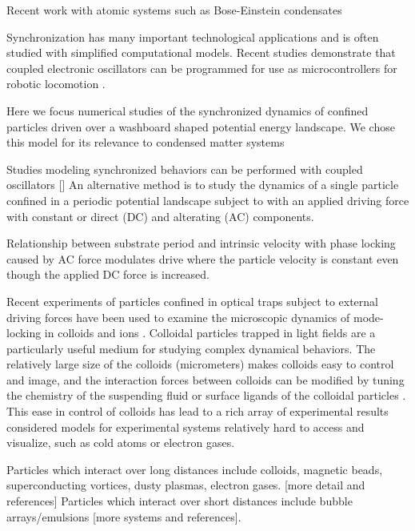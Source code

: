 \documentclass[twocolumn,preprintnumbers,amsmath,amssymb,aps,prx]{revtex4}
\begin{document}
Recent work with atomic systems such as Bose-Einstein condensates \cite{Zhang2020}

Synchronization has many important
technological applications
and is often studied with simplified computational models.
Recent studies demonstrate
that coupled electronic oscillators can be
programmed for use as microcontrollers for robotic locomotion \cite{Dutta2019}.

Here we focus numerical studies 
of the synchronized dynamics
of confined particles driven over
a washboard shaped potential energy landscape. 
We chose this model for its
relevance to condensed matter systems



Studies modeling synchronized behaviors
can be performed with
coupled oscillators []
An alternative method is to
study the dynamics of a single particle
confined in a periodic 
potential landscape subject
to with an applied driving force with constant or direct (DC)
and alterating (AC)
components.

Relationship between substrate period and intrinsic velocity
with phase locking caused by AC force modulates drive
where the particle velocity is constant even though the applied
DC force is increased.



Recent experiments of particles confined
in optical traps
subject to external driving forces 
have
been used to examine the microscopic dynamics
of mode-locking in colloids \cite{juniper2015} and ions \cite{Bushev2013}.
Colloidal particles trapped in light fields are %
a particularly useful medium for studying complex dynamical behaviors.  %
The relatively large size of the colloids (micrometers)
makes colloids easy to control and image,
and the interaction forces between colloids can be modified
by tuning the chemistry of the suspending fluid or surface ligands
of the colloidal particles \cite{Grier2003}.
This ease in control of colloids has lead to a rich array of 
experimental results  
considered models
for experimental systems relatively hard to access and visualize,
such as cold atoms or electron gases. %

Particles which interact over long distances
include colloids, magnetic beads, superconducting vortices, dusty plasmas, electron gases. [more detail and references]
Particles which interact over short distances include
bubble arrays/emulsions [more systems and references].
\end{document}
